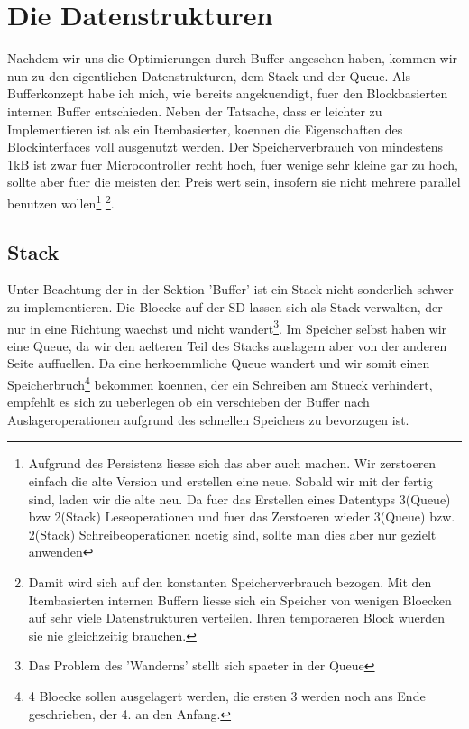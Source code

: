 \documentclass[10pt,a4paper]{article}
\begin{document}
\section{Die Datenstrukturen}
Nachdem wir uns die Optimierungen durch Buffer angesehen haben, kommen wir nun zu den eigentlichen Datenstrukturen, dem Stack und der Queue. Als Bufferkonzept habe ich mich, wie bereits angekuendigt, fuer den Blockbasierten internen Buffer entschieden. Neben der Tatsache, dass er leichter zu Implementieren ist als ein Itembasierter, koennen die Eigenschaften des Blockinterfaces voll ausgenutzt werden. Der Speicherverbrauch von mindestens 1kB ist zwar fuer Microcontroller recht hoch, fuer wenige sehr kleine gar zu hoch, sollte aber fuer die meisten den Preis wert sein, insofern sie nicht mehrere parallel benutzen wollen\footnote{Aufgrund des Persistenz liesse sich das aber auch machen. Wir zerstoeren einfach die alte Version und erstellen eine neue. Sobald wir mit der fertig sind, laden wir die alte neu. Da fuer das Erstellen eines Datentyps 3(Queue) bzw 2(Stack) Leseoperationen und fuer das Zerstoeren wieder 3(Queue) bzw. 2(Stack) Schreibeoperationen noetig sind, sollte man dies aber nur gezielt anwenden} \footnote{Damit wird sich auf den konstanten Speicherverbrauch bezogen. Mit den Itembasierten internen Buffern liesse sich ein Speicher von wenigen Bloecken auf sehr viele Datenstrukturen verteilen. Ihren temporaeren Block wuerden sie nie gleichzeitig brauchen.}.
\subsection{Stack}
Unter Beachtung der in der Sektion 'Buffer' ist ein Stack nicht sonderlich schwer zu implementieren. Die Bloecke auf der SD lassen sich als Stack verwalten, der nur in eine Richtung waechst und nicht wandert\footnote{Das Problem des 'Wanderns' stellt sich spaeter in der Queue}. Im Speicher selbst haben wir eine Queue, da wir den aelteren Teil des Stacks auslagern aber von der anderen Seite auffuellen. Da eine herkoemmliche Queue wandert und wir somit einen Speicherbruch\footnote{4 Bloecke sollen ausgelagert werden, die ersten 3 werden noch ans Ende geschrieben, der 4. an den Anfang.} bekommen koennen, der ein Schreiben am Stueck verhindert, empfehlt es sich zu ueberlegen ob ein verschieben der Buffer nach Auslageroperationen aufgrund des schnellen Speichers zu bevorzugen ist.\\
\end{document}
